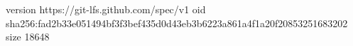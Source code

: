 version https://git-lfs.github.com/spec/v1
oid sha256:fad2b33e051494bf3f3bef435d0d43eb3b6223a861a4f1a20f20853251683202
size 18648
